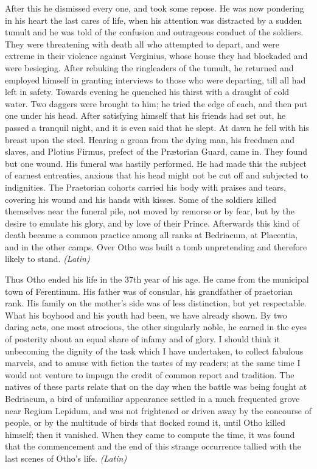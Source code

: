
After this he dismissed every one, and took some repose. He was now pondering in his heart the last cares of life, when his attention was distracted by a sudden tumult and he was told of the confusion and outrageous conduct of the soldiers. They were threatening with death all who attempted to depart, and were extreme in their violence against Verginius, whose house they had blockaded and were besieging. After rebuking the ringleaders of the tumult, he returned and employed himself in granting interviews to those who were departing, till all had left in safety. Towards evening he quenched his thirst with a draught of cold water. Two daggers were brought to him; he tried the edge of each, and then put one under his head. After satisfying himself that his friends had set out, he passed a tranquil night, and it is even said that he slept. At dawn he fell with his breast upon the steel. Hearing a groan from the dying man, his freedmen and slaves, and Plotius Firmus, prefect of the Prætorian Guard, came in. They found but one wound. His funeral was hastily performed. He had made this the subject of earnest entreaties, anxious that his head might not be cut off and subjected to indignities. The Praetorian cohorts carried his body with praises and tears, covering his wound and his hands with kisses. Some of the soldiers killed themselves near the funeral pile, not moved by remorse or by fear, but by the desire to emulate his glory, and by love of their Prince. Afterwards this kind of death became a common practice among all ranks at Bedriacum, at Placentia, and in the other camps. Over Otho was built a tomb unpretending and therefore likely to stand. \emph{(Latin)}


Thus Otho ended his life in the 37th year of his age. He came from the municipal town of Ferentinum. His father was of consular, his grandfather of praetorian rank. His family on the mother's side was of less distinction, but yet respectable. What his boyhood and his youth had been, we have already shown. By two daring acts, one most atrocious, the other singularly noble, he earned in the eyes of posterity about an equal share of infamy and of glory. I should think it unbecoming the dignity of the task which I have undertaken, to collect fabulous marvels, and to amuse with fiction the tastes of my readers; at the same time I would not venture to impugn the credit of common report and tradition. The natives of these parts relate that on the day when the battle was being fought at Bedriacum, a bird of unfamiliar appearance settled in a much frequented grove near Regium Lepidum, and was not frightened or driven away by the concourse of people, or by the multitude of birds that flocked round it, until Otho killed himself; then it vanished. When they came to compute the time, it was found that the commencement and the end of this strange occurrence tallied with the last scenes of Otho's life. \emph{(Latin)}

